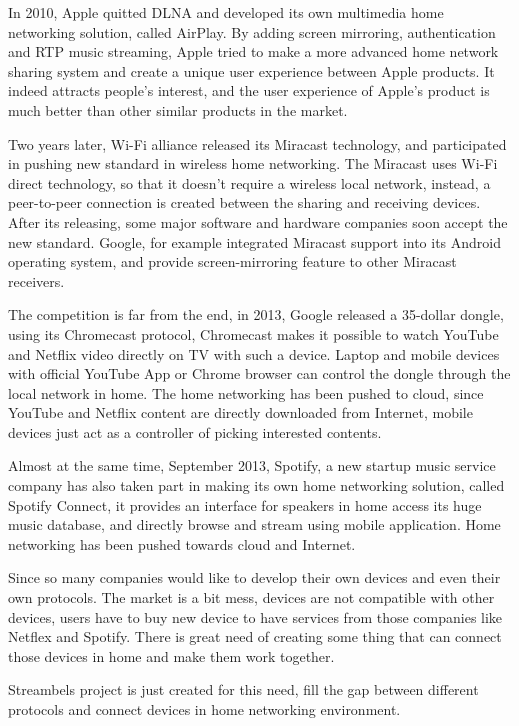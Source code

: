 In 2010, Apple quitted DLNA and developed its own multimedia home networking solution, called 
AirPlay. By adding screen mirroring, authentication and RTP music streaming, Apple tried to make 
a more advanced home network sharing system and create a unique user experience between Apple 
products. It indeed attracts people's interest, and the user experience of Apple's product is 
much better than other similar products in the market. 

Two years later, Wi-Fi alliance released its Miracast technology, and participated in pushing 
new standard in wireless home networking. The Miracast uses Wi-Fi direct technology, so that 
it doesn't require a wireless local network, instead, a peer-to-peer connection is created between 
the sharing and receiving devices. After its releasing, some major software and hardware companies 
soon accept the new standard. Google, for example integrated Miracast support into its Android 
operating system, and provide screen-mirroring feature to other Miracast receivers.

The competition is far from the end, in 2013, Google released a 35-dollar dongle, using its 
Chromecast protocol, Chromecast makes it possible to watch YouTube and Netflix video directly 
on TV with such a device. Laptop and mobile devices with official YouTube App or Chrome browser 
can control the dongle through the local network in home. The home networking
has been pushed to cloud, since YouTube and Netflix content are directly
downloaded from Internet, mobile devices just act as a controller of picking interested contents. 

Almost at the same time, September 2013, Spotify, a new startup music service company has also 
taken part in making its own home networking solution, called Spotify Connect, it provides an 
interface for speakers in home access its huge music database, and directly browse and stream 
using mobile application. Home networking has been pushed towards cloud and Internet.

Since so many companies would like to develop their own devices and even their own protocols. 
The market is a bit mess, devices are not compatible with other devices, users have to buy new 
device to have services from those companies like Netflex and Spotify. There is great need of 
creating some thing that can connect those devices in home and make them work together. 

Streambels project is just created for this need, fill the gap between different protocols and 
connect devices in home networking environment.

